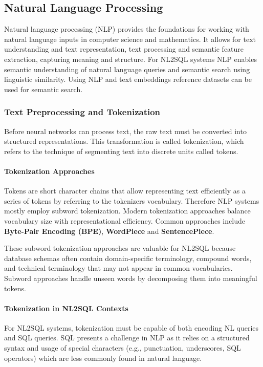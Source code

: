 \subsection{Natural Language Processing}

Natural language processing (NLP) provides the foundations for working with
natural language inputs in computer science and mathematics. It allows for text
understanding and text representation, text processing and semantic feature
extraction, capturing meaning and structure. For NL2SQL systems NLP enables
semantic understanding of natural language queries and semantic search using
linguistic similarity. Using NLP and text embeddings reference datasets can be
used for semantic search.

\subsubsection{Text Preprocessing and Tokenization}

Before neural networks can process text, the raw text must be converted into
structured representations. This transformation is called tokenization, which
refers to the technique of segmenting text into discrete units called tokens.

\paragraph{Tokenization Approaches}

Tokens are short character chains that allow representing text efficiently as a
series of tokens by referring to the tokenizers vocabulary. Therefore NLP
systems mostly employ subword tokenization. Modern tokenization approaches
balance vocabulary size with representational efficiency. Common approaches
include \textbf{Byte-Pair Encoding (BPE)}, \textbf{WordPiece} and
\textbf{SentencePiece}.

These subword tokenization approaches are valuable for NL2SQL because database
schemas often contain domain-specific terminology, compound words, and
technical terminology that may not appear in common vocabularies. Subword
approaches handle unseen words by decomposing them into meaningful tokens.

\paragraph{Tokenization in NL2SQL Contexts}

For NL2SQL systems, tokenization must be capable of both encoding NL queries
and SQL queries. SQL presents a challenge in NLP as it relies on a structured
syntax and usage of special characters (e.g., punctuation, underscores, SQL
operators) which are less commonly found in natural language.


